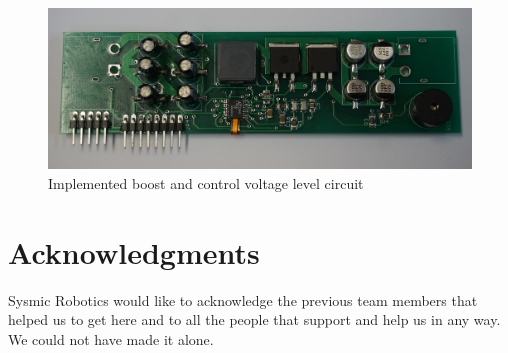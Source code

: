 \documentclass{llncs}
\begin{document}
\begin{figure}[H]
    \centering
    \includegraphics[width= \textwidth, clip]{Images/Power_source_motor2.png}
    \caption{Implemented boost and control voltage level circuit}
    \label{fig:boost2}
\end{figure}


{
    \renewcommand{\clearpage}{} 
    
}



\section*{Acknowledgments}

Sysmic Robotics would like to acknowledge the previous team members that helped us to get here and to all the people that support and help us in any way. We could not have made it alone.

\end{document}
